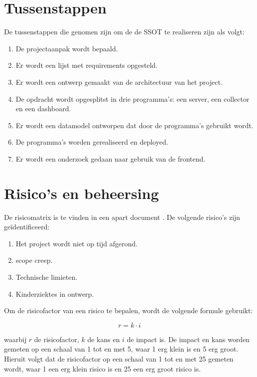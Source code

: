 \documentclass[../report.tex]{subfiles}
\begin{document}
\section{Tussenstappen}

De tussenstappen die genomen zijn om de de \gls*{SSOT} te realiseren zijn als volgt:

\begin{enumerate}
  \item De projectaanpak wordt bepaald.
  \item Er wordt een lijst met requirements opgesteld.
  \item Er wordt een ontwerp gemaakt van de architectuur van het project.
  \item De opdracht wordt opgesplitst in drie programma's: een \gls*{server}, een collector en een dashboard.
  \item Er wordt een datamodel ontworpen dat door de programma's gebruikt wordt.
  \item De programma's worden gerealiseerd en deployed.
  \item Er wordt een onderzoek gedaan naar gebruik van de \gls*{frontend}.
\end{enumerate}

\section{Risico's en beheersing}

De risicomatrix is te vinden in een apart document \parencite{risks}. De volgende risico's zijn geïdentificeerd:

\begin{enumerate}[R1]
  \item \label{itm:R1} Het project wordt niet op tijd afgerond.
  \item \label{itm:R2} \Gls*{scope creep}.
  \item \label{itm:R3} Technische limieten.
  \item \label{itm:R4} Kinderziektes in ontwerp.
\end{enumerate}

Om de risicofactor van een risico te bepalen, wordt de volgende formule gebruikt:

\begin{displaymath}
  r = k \cdot i
\end{displaymath}

waarbij $r$ de risicofactor, $k$ de kans en $i$ de impact is. De impact en kans worden gemeten op een schaal van 1 tot en met 5, waar 1 erg klein is en 5 erg groot. Hieruit volgt dat de risicofactor op een schaal van 1 tot en met 25 gemeten wordt, waar 1 een erg klein risico is en 25 een erg groot risico is.
\end{document}
